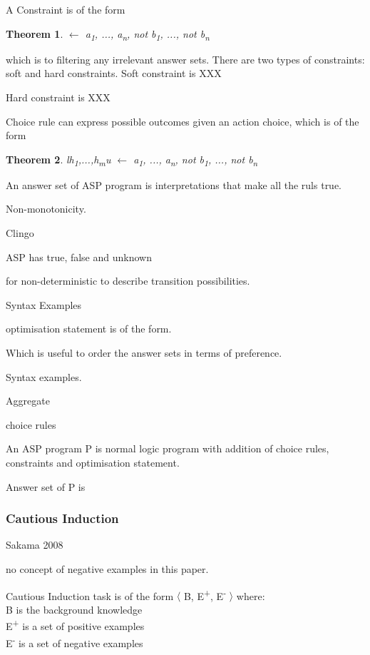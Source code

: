 \documentclass[12pt,twoside]{report}
\newtheorem{theorem}{Theorem}
\begin{document}
A Constraint is of the form

\begin{theorem}
$\leftarrow$ a\textsubscript{1}, ..., a\textsubscript{n}, not b\textsubscript{1}, ..., not b\textsubscript{n}
\end{theorem}

which is to filtering any irrelevant answer sets.
There are two types of constraints: soft and hard constraints. Soft constraint is XXX

Hard constraint is XXX

Choice rule can express possible outcomes given an action choice, which is of the form

\begin{theorem}
l{h\textsubscript{1},...,h\textsubscript{m}}u $\leftarrow$ a\textsubscript{1}, ..., a\textsubscript{n}, not b\textsubscript{1}, ..., not b\textsubscript{n}
\end{theorem}



An answer set of ASP program is interpretations that make all the ruls true.

Non-monotonicity.

Clingo

ASP has true, false and unknown



for non-deterministic to describe transition possibilities.


Syntax Examples


optimisation statement is of the form.

Which is useful to order the answer sets in terms of preference.

Syntax examples.

Aggregate

choice rules

An ASP program P is normal logic program with addition of choice rules, constraints and optimisation statement.

Answer set of P is


\subsubsection{Cautious Induction}

Sakama 2008

no concept of negative examples in this paper.

Cautious Induction task is of the form $\langle$ B, E\textsuperscript{+}, E\textsuperscript{-} $\rangle$ where: \\
B is the background knowledge \\
E\textsuperscript{+} is a set of positive examples \\
E\textsuperscript{-} is a set of negative examples \\
\end{document}
